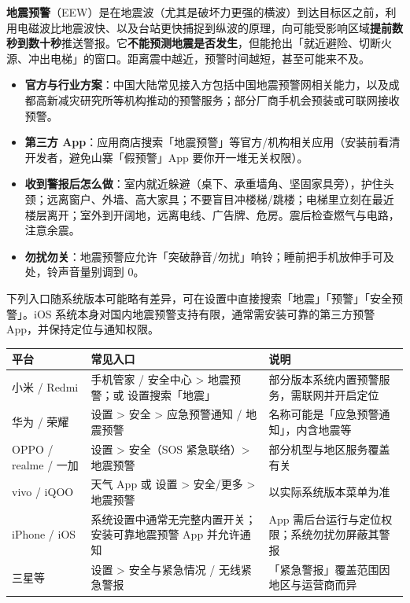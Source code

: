 
\textbf{地震预警}（EEW）是在地震波（尤其是破坏力更强的横波）到达目标区之前，利用电磁波比地震波快、以及台站更快捕捉到纵波的原理，向可能受影响区域\textbf{提前数秒到数十秒}推送警报。它\textbf{不能预测地震是否发生}，但能抢出「就近避险、切断火源、冲出电梯」的窗口。距离震中越近，预警时间越短，甚至可能来不及。

\begin{itemize}
  \item \textbf{官方与行业方案}：中国大陆常见接入方包括中国地震预警网相关能力，以及成都高新减灾研究所等机构推动的预警服务；部分厂商手机会预装或可联网接收预警。
  \item \textbf{第三方 App}：应用商店搜索「地震预警」等官方/机构相关应用（安装前看清开发者，避免山寨「假预警」App 要你开一堆无关权限）。
  \item \textbf{收到警报后怎么做}：室内就近躲避（桌下、承重墙角、坚固家具旁），护住头颈；远离窗户、外墙、高大家具；不要盲目冲楼梯/跳楼；电梯里立刻在最近楼层离开；室外到开阔地，远离电线、广告牌、危房。震后检查燃气与电路，注意余震。
  \item \textbf{勿扰勿关}：地震预警应允许「突破静音/勿扰」响铃；睡前把手机放伸手可及处，铃声音量别调到 0。
\end{itemize}


下列入口随系统版本可能略有差异，可在设置中直接搜索「地震」「预警」「安全预警」。iOS 系统本身对国内地震预警支持有限，通常需安装可靠的第三方预警 App，并保持定位与通知权限。

\begin{center}
\begin{tabularx}{\linewidth}{|X|X|X|}
\hline
\textbf{平台} & \textbf{常见入口} & \textbf{说明} \tabularnewline
\hline
小米 / Redmi & 手机管家 / 安全中心 > 地震预警；或 设置搜索「地震」 & 部分版本系统内置预警服务，需联网并开启定位 \tabularnewline
华为 / 荣耀 & 设置 > 安全 > 应急预警通知 / 地震预警 & 名称可能是「应急预警通知」，内含地震等 \tabularnewline
OPPO / realme / 一加 & 设置 > 安全（SOS 紧急联络）> 地震预警 & 部分机型与地区服务覆盖有关 \tabularnewline
vivo / iQOO & 天气 App 或 设置 > 安全/更多 > 地震预警 & 以实际系统版本菜单为准 \tabularnewline
iPhone / iOS & 系统设置中通常无完整内置开关；安装可靠地震预警 App 并允许通知 & App 需后台运行与定位权限；系统勿扰勿屏蔽其警报 \tabularnewline
三星等 & 设置 > 安全与紧急情况 / 无线紧急警报 & 「紧急警报」覆盖范围因地区与运营商而异 \tabularnewline
\hline
\end{tabularx}
\end{center}

